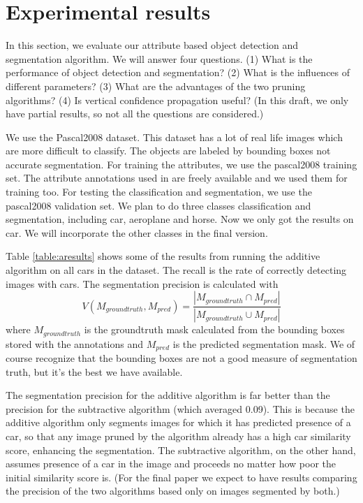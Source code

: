 \documentclass[10pt,twocolumn,letterpaper]{article}
\begin{document}
\section{Experimental results}
\label{sec:results}

In this section, we evaluate our attribute based object detection
and segmentation algorithm. We will answer four questions. (1) What
is the performance of object detection and segmentation? (2) What is
the influences of different parameters? (3) What are the advantages
of the two pruning algorithms? (4) Is vertical confidence
propagation useful? (In this draft, we only have partial results, so
not all the questions are considered.)


We use the Pascal2008 dataset. This dataset has a lot of real life
images which are more difficult to classify. The objects are labeled
by bounding boxes not accurate segmentation. For training the
attributes, we use the pascal2008 training set. The attribute
annotations used in \cite{farhadi09} are freely available and we
used them for training too. For testing the classification and
segmentation, we use the pascal2008 validation set. We plan to do
three classes classification and segmentation, including car,
aeroplane and horse. Now we only got the results on car. We will
incorporate the other classes in the final version.

Table \ref{table:aresults} shows some of the results from running
the additive algorithm on all cars in the dataset.  The recall is
the rate of correctly detecting images with cars.  The segmentation
precision is calculated with
\[ V(M_{groundtruth},M_{pred}) = \frac{|M_{groundtruth} \cap M_{pred}|}{|M_{groundtruth} \cup M_{pred}|} \]
where $M_{groundtruth}$ is the groundtruth mask calculated from the
bounding boxes stored with the annotations and $M_{pred}$ is the
predicted segmentation mask.  We of course recognize that the
bounding boxes are not a good measure of segmentation truth, but
it's the best we have available.

The segmentation precision for the additive algorithm
is far better than the precision for the subtractive algorithm (which averaged
0.09).  This is because the additive algorithm only segments images for
which it has predicted presence of a car, so that any image pruned by the
algorithm already has a high car similarity score, enhancing the segmentation.
The subtractive algorithm, on the other hand, assumes presence of a car in
the image and proceeds no matter how poor the initial similarity score is.
(For the final paper we expect to have results comparing the precision
of the two algorithms based only on images segmented by both.)
\end{document}
